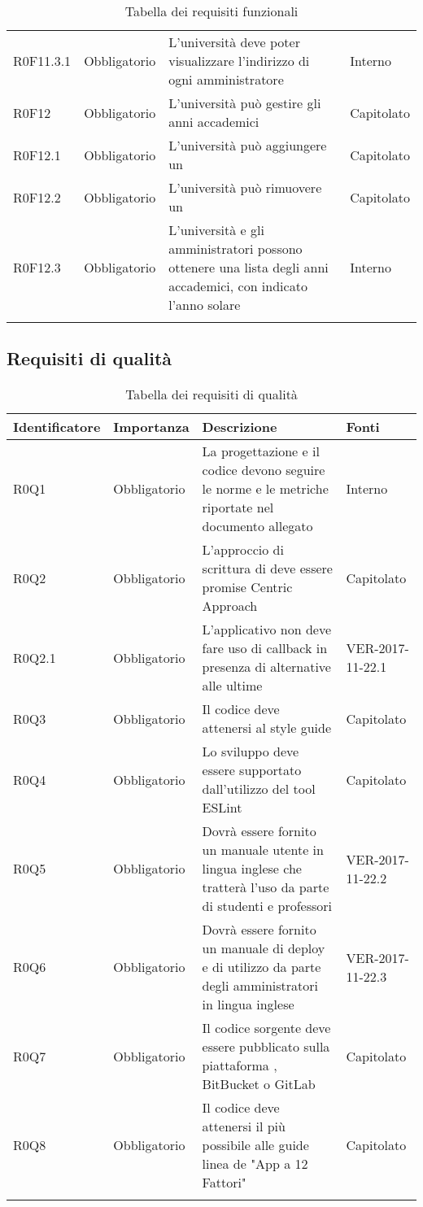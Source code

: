 \documentclass[AnalisiDeiRequisiti.tex]{subfiles}
\begin{document}
\begin{longtable}[H]{p{2.6cm}p{2.5cm}p{5cm}p{2cm}}
	R0F11.3.1 & Obbligatorio & L'università deve poter visualizzare l'indirizzo di ogni amministratore & Interno \\
	R0F12 & Obbligatorio & L'università può gestire gli anni accademici & Capitolato \\
	R0F12.1 & Obbligatorio & L'università può aggiungere un \citGloss{anno accademico} & Capitolato \\
	R0F12.2 & Obbligatorio & L'università può rimuovere un \citGloss{anno accademico} & Capitolato \\
	R0F12.3 & Obbligatorio & L'università e gli amministratori possono ottenere una lista degli anni accademici, con indicato l'anno solare & Interno \\
	\hiderowcolors
	\caption{Tabella dei requisiti funzionali}
\end{longtable}

\subsection{Requisiti di qualità}

\label{table:Tabella requisiti di qualita'}
\renewcommand*{\arraystretch}{1.2}
\begin{longtable}[H]{p{2.5cm}p{2.5cm}p{5cm}p{2cm}}
	\rowcolor{CHeader} 
	\color{CHeaderText} \textbf{Identificatore} & \color{CHeaderText} \textbf{Importanza} & \color{CHeaderText} \textbf{Descrizione} & \color{CHeaderText} \textbf{Fonti} \\
	\endhead
	R0Q1 & Obbligatorio & La progettazione e il codice devono seguire le norme e le metriche riportate nel documento allegato \pdq \vruno & Interno \\
	R0Q2 & Obbligatorio & L'approccio di scrittura di \citGloss{JavaScript} deve essere promise Centric Approach & Capitolato \\
	R0Q2.1 & Obbligatorio & L'applicativo non deve fare uso di callback in presenza di alternative alle ultime & VER-2017-11-22.1 \\
	R0Q3 & Obbligatorio & Il codice \citGloss{JavaScript} deve attenersi al \citGloss{airbnb} \citGloss{JavaScript} style guide & Capitolato \\
	R0Q4 & Obbligatorio & Lo sviluppo deve essere supportato dall'utilizzo del tool ESLint & Capitolato \\
	R0Q5 & Obbligatorio & Dovrà essere fornito un manuale utente in lingua inglese che tratterà l'uso da parte di studenti e professori & VER-2017-11-22.2 \\
	R0Q6 & Obbligatorio & Dovrà essere fornito un manuale di deploy e di utilizzo da parte degli amministratori in lingua inglese & VER-2017-11-22.3 \\
	R0Q7 & Obbligatorio & Il codice sorgente deve essere pubblicato sulla piattaforma \citGloss{GitHub}, BitBucket o GitLab & Capitolato \\
	R0Q8 & Obbligatorio & Il codice deve attenersi il più possibile alle guide linea de "App a 12 Fattori" & Capitolato \\ 
	\hiderowcolors
	\caption{Tabella dei requisiti di qualità}
\end{longtable}
\end{document}
